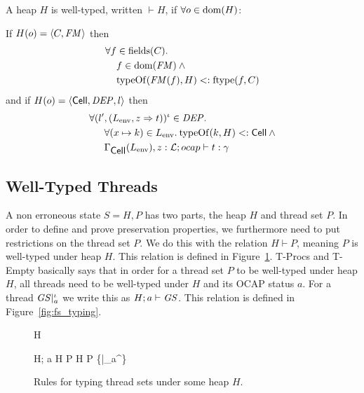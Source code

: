\begin{definition}
  A heap $H$ is well-typed, written $\vdash{H}$, if
  $\forall o \in \mbox{$\mathrm{dom}$}{(H)}$:

  If $H(o) = \mbox{$\langle C, \mathit{FM} \rangle$}$ then
  \begin{equation} \label{eq:defwth1}
    \begin{aligned}
      \forall f &\in \mbox{$\mathrm{fields}$}{(C)}. \\ 
      &f \in \mbox{$\mathrm{dom}$}{(\ensuremath{\mathit{FM}})} \: \land \\ 
      &\mbox{$\mathrm{typeOf}$}{(\ensuremath{\mathit{FM}}(f), H)} <: \mbox{$\mathrm{ftype}$}{(f, C)}
    \end{aligned}
  \end{equation}
  and if $H(o) = \mbox{$\langle \mbox{$\mathsf{Cell}$}{}, \mathit{DEP}, l \rangle$}$ then
  \begin{equation} \label{eq:defwth2}
    \begin{aligned}
      \forall (l'&, (L_{\text{env}}, z \Rightarrow t))^\iota \in \mathit{DEP}. \\
      &\forall (x \mapsto k) \in L_{\text{env}}.\: \mbox{$\mathrm{typeOf}$}{(k, H)} <:
      \mbox{$\mathsf{Cell}$} \: \land \\
      &\mbox{$\Gamma_{\mbox{$\mathsf{Cell}$}{}}(L_{\text{env}}), z:
      \mbox{$\mathcal{L}$};\mbox{$ocap$}\vdash t:\gamma$} 
    \end{aligned}
  \end{equation}
\end{definition}

\subsection{Well-Typed Threads}%
\label{sub:well_typed_threads}

A non erroneous state $S = H, P$ has two parts, the heap $H$ and thread set $P$.
In order to define and prove preservation properties, we furthermore need to put
restrictions on the thread set $P$. We do this with the relation $H \vdash P$,
meaning $P$ is well-typed under heap $H$. This relation is defined in
Figure~\ref{fig:ts_typing}.  {\sc T-Procs} and {\sc T-Empty} basically says that
in order for a thread set $P$ to be well-typed under heap $H$, all threads need
to be well-typed under $H$ and its OCAP status $a$.  For a thread $\mathit{GS}|_a^\iota$
we write this as $H; a \vdash \mathit{GS}$. This relation is defined in
Figure~\ref{fig:fs_typing}. 

\begin{figure}
  {H \vdash \emptyset}

  \RuleSpace{}

  { H; a \vdash \FS \andalso H \vdash P }
  { H \vdash P \cup \left\{\FS |_a^\iota \right\} }

  \caption{Rules for typing thread sets under some heap $H$.}
  \label{fig:ts_typing}
\end{figure}

